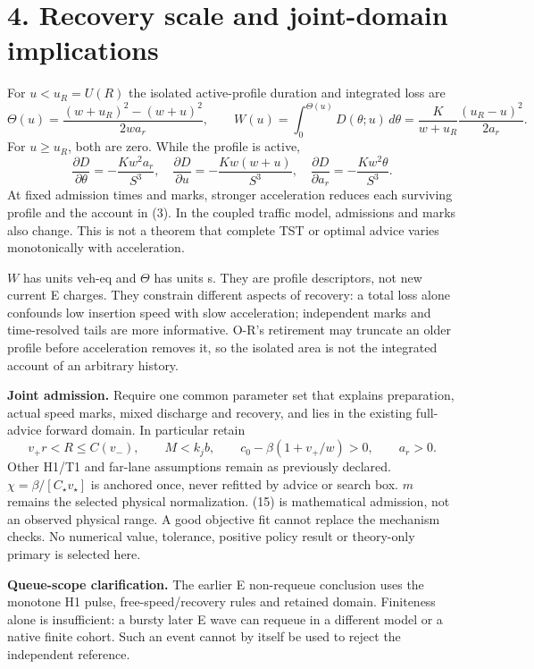 \documentclass[11pt,a4paper]{article}
\begin{document}
\newpage
\section*{4. Recovery scale and joint-domain implications}
For $u<u_R=U(R)$ the isolated active-profile duration and integrated loss are
\begin{equation}
 \Theta(u)=\frac{(w+u_R)^2-(w+u)^2}{2wa_r},\qquad
 W(u)=\int_0^{\Theta(u)}D(\theta;u)\,d\theta
      =\frac{K}{w+u_R}\frac{(u_R-u)^2}{2a_r}. \tag{13}
\end{equation}
For $u\geq u_R$, both are zero. While the profile is active,
\begin{equation}
 \frac{\partial D}{\partial\theta}=-\frac{Kw^2a_r}{S^3},\quad
 \frac{\partial D}{\partial u}=-\frac{Kw(w+u)}{S^3},\quad
 \frac{\partial D}{\partial a_r}=-\frac{Kw^2\theta}{S^3}. \tag{14}
\end{equation}
At fixed admission times and marks, stronger acceleration reduces each
surviving profile and the account in (3). In the coupled traffic model,
admissions and marks also change. This is not a theorem that complete TST
or optimal advice varies monotonically with acceleration.

$W$ has units veh-eq and $\Theta$ has units s. They are profile descriptors,
not new current E charges. They constrain different aspects of recovery:
a total loss alone confounds low insertion speed with slow acceleration;
independent marks and time-resolved tails are more informative. O-R's
retirement may truncate an older profile before acceleration removes it,
so the isolated area is not the integrated account of an arbitrary history.

\textbf{Joint admission.} Require one common parameter set that explains
preparation, actual speed marks, mixed discharge and recovery, and lies in
the existing full-advice forward domain. In particular retain
\begin{equation}
 v_+r<R\leq C(v_-),\qquad M<k_jb,\qquad
 c_0-\beta(1+v_+/w)>0,\qquad a_r>0. \tag{15}
\end{equation}
Other H1/T1 and far-lane assumptions remain as previously declared.
$\chi=\beta/[C_\star v_\star]$ is anchored once, never refitted by advice
or search box. $m$ remains the selected physical normalization. (15) is
mathematical admission, not an observed physical range. A good objective
fit cannot replace the mechanism checks. No numerical value, tolerance,
positive policy result or theory-only primary is selected here.

\textbf{Queue-scope clarification.} The earlier E non-requeue conclusion
uses the monotone H1 pulse, free-speed/recovery rules and retained domain.
Finiteness alone is insufficient: a bursty later E wave can requeue in a
different model or a native finite cohort. Such an event cannot by itself
be used to reject the independent reference.
\end{document}
